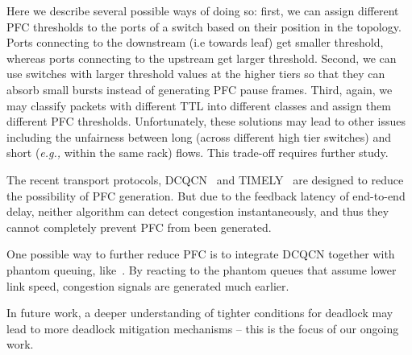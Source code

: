 Here we describe several possible ways of doing so: first, we can assign
different PFC thresholds to the ports of a switch based on their position in the
topology. Ports connecting to the downstream (i.e towards leaf) get smaller
threshold, whereas ports connecting to the upstream get larger threshold.
Second, we can use switches with larger threshold values at the higher tiers so
that they can absorb small bursts instead of generating PFC pause frames. Third,
again, we may classify packets with different TTL into different classes and
assign them different PFC thresholds.  Unfortunately, these solutions may lead
to other issues including the unfairness between long (across different high
tier switches) and short ({\em e.g.,} within the same rack) flows.  This
trade-off requires further study.

 The recent transport protocols,
DCQCN~\cite{dcqcn} and TIMELY~\cite{timely} are designed to reduce the
possibility of PFC generation. But due to the feedback latency of end-to-end
delay, neither algorithm can detect congestion instantaneously, and thus they
cannot completely prevent PFC from been generated. 

One possible way to further reduce PFC is to integrate DCQCN together with
phantom queuing, like~\cite{Alizadeh12}. By reacting to the phantom queues that
assume lower link speed, congestion signals are generated much earlier. 

 In future work, a deeper understanding of
tighter conditions for deadlock may lead to more deadlock mitigation mechanisms
-- this is the focus of our ongoing work.
